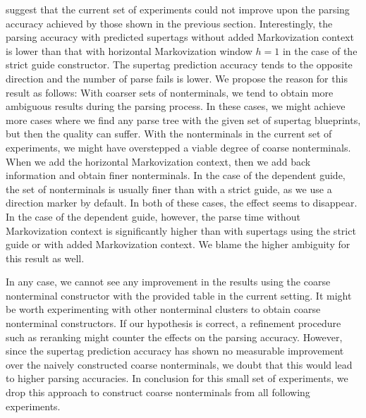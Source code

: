 \documentclass[../../document.tex]{subfiles}
\begin{document}
     suggest that the current set of experiments could not improve upon the parsing accuracy achieved by those shown in the previous section.
    Interestingly, the parsing accuracy with predicted supertags without added Markovization context is lower than that with horizontal Markovization window \(h=1\) in the case of the strict guide constructor. The supertag prediction accuracy tends to the opposite direction and the number of parse fails is lower.
    We propose the reason for this result as follows:
        With coarser sets of nonterminals, we tend to obtain more ambiguous results during the parsing process.
        In these cases, we might achieve more cases where we find any parse tree with the given set of supertag blueprints, but then the quality can suffer.
        With the nonterminals in the current set of experiments, we might have overstepped a viable degree of coarse nonterminals.
        When we add the horizontal Markovization context, then we add back information and obtain finer nonterminals.
        In the case of the dependent guide, the set of nonterminals is usually finer than with a strict guide, as we use a direction marker by default.
        In both of these cases, the effect seems to disappear.
    In the case of the dependent guide, however, the parse time without Markovization context is significantly higher than with supertags using the strict guide or with added Markovization context.
    We blame the higher ambiguity for this result as well.

    In any case, we cannot see any improvement in the results using the coarse nonterminal constructor with the provided table in the current setting.
    It might be worth experimenting with other nonterminal clusters to obtain coarse nonterminal constructors.
    If our hypothesis is correct, a refinement procedure such as reranking might counter the effects on the parsing accuracy.
    However, since the supertag prediction accuracy has shown no measurable improvement over the naively constructed coarse nonterminals, we doubt that this would lead to higher parsing accuracies.
    In conclusion for this small set of experiments, we drop this approach to construct coarse nonterminals from all following experiments. 
    
\end{document}
